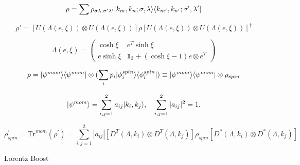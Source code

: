 \begin{equation}
    \rho = \sum \rho_{\sigma \lambda, \sigma' \lambda'} \lvert k_m, k_n ; \sigma, \lambda\rangle \langle k_{m'}, k_{n'} ; \sigma', \lambda'\rvert
\end{equation}

\begin{equation}
    \rho' = \left[ U(\Lambda(e, \xi)) \otimes U(\Lambda(e, \xi)) \right] \rho \left[ U(\Lambda(e, \xi)) \otimes U(\Lambda(e, \xi)) \right]^\dagger
\end{equation}

\begin{equation}
    \Lambda(e, \xi) =
    \begin{pmatrix}
        \cosh \xi & e^T \sinh \xi \\
        e \sinh \xi & \mathds{1}_3 + (\cosh \xi - 1) e \otimes e^T
    \end{pmatrix}
\end{equation}

\begin{equation}
    \rho = \lvert\psi^{mom}\rangle\langle\psi^{mom}\rvert \otimes (\sum_{i} p_i\lvert\phi_i^{spin}\rangle\langle\phi_i^{spin}\rvert) \equiv \lvert\psi^{mom}\rangle\langle\psi^{mom}\rvert \otimes \rho_{spin}
\end{equation}

\begin{equation}
    \lvert\psi^{mom}\rangle = \sum_{i,j=1}^{2}a_{ij}\lvert k_i,k_j\rangle, \quad \sum_{i,j=1}^{2}|a_{ij}|^2 = 1.
\end{equation}

\begin{equation}
    \rho^\prime_{spin} = \text{Tr}^{mom}(\rho^\prime) = \sum_{i,j=1}^{2}|a_{ij}|[D^T(\Lambda,k_i) \otimes D^T(\Lambda,k_j)]\rho_{spin}[D^*(\Lambda,k_i) \otimes D^*(\Lambda,k_j)]
\end{equation}

Lorentz Boost
